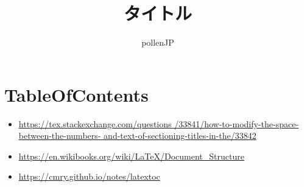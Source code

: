 \documentclass{jsarticle}	       %
\title{タイトル}
\author{pollenJP}
\begin{document}
	
	\maketitle
	
	\renewcommand\contentsname{目次（もくじだよ）}
	\tableofcontents
	
	\section{TableOfContents}
		\begin{itemize}
			\item \url{https://tex.stackexchange.com/questions
				/33841/how-to-modify-the-space-between-the-numbers-
				and-text-of-sectioning-titles-in-the/33842
				}
			\item \url{https://en.wikibooks.org/wiki/LaTeX/Document_Structure}
			\item \url{https://cmry.github.io/notes/latextoc}
		\end{itemize}
\end{document}
